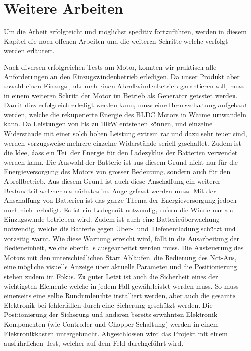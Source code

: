 \section{Weitere Arbeiten}
Um die Arbeit erfolgreicht und möglichst speditiv fortzuführen, werden in diesem Kapitel die noch offenen Arbeiten und die weiteren Schritte welche verfolgt werden erläutert.

Nach diversen erfolgreichen Tests am Motor, konnten wir praktisch alle Anforderungen an den Einzugswindenbetrieb erledigen. Da unser Produkt aber sowohl einen Einzugs-, als auch einen Abrollwindenbetrieb garantieren soll, muss in einem weiteren Schritt der Motor im Betrieb als Generator getestet werden. Damit dies erfolgreich erledigt werden kann, muss eine Bremsschaltung aufgebaut werden, welche die rekuperierte Energie des BLDC Motors in Wärme umwandeln kann. Da Leistungen von bis zu 10kW entstehen können, und einzelne Widerstände mit einer solch hohen Leistung extrem rar und dazu sehr teuer sind, werden vorzugsweise mehrere einzelne Widerstände seriell geschaltet. Zudem ist die Idee, dass ein Teil der Energie für den Ladezyklus der Batterien verwendet werden kann.
Die Auswahl der Batterie ist aus diesem Grund nicht nur für die Energieversorgung des Motors von grosser Bedeutung, sondern auch für den Abrollbetrieb. Aus diesem Grund ist auch diese Anschaffung ein weiterer Bestandteil welcher als nächstes ins Auge gefasst werden muss. Mit der Anschaffung von Batterien ist das ganze Thema der Energieversorgung jedoch noch nicht erledigt. Es ist ein Ladegerät notwendig, sofern die Winde nur als Einzugswinde betrieben wird. Zudem ist auch eine Batterieüberwachung notwendig, welche die Batterie gegen Über-, und Tiefenentladung schützt und vorzeitig warnt. Wie diese Warnung erreicht wird, fällt in die Ausarbeitung der Bedieneinheit, welche ebenfalls ausgearbeitet werden muss. Die Ansteuerung des Motors mit den unterschiedlichen Start Abläufen, die Bedienung des Not-Aus, eine mögliche visuelle Anzeige über aktuelle Parameter und die Positionierung stehen zudem im Fokus.
Zu guter Letzt ist auch die Sicherheit eines der wichtigsten Elemente welche in jedem Fall gewährleistet werden muss. So muss einerseits eine gelbe Rundumleuchte installiert werden, aber auch die gesamte Elektronik bei fehlerfällen durch eine Sicherung geschützt werden. Die Positionierung der Sicherung und anderen bereits erwähnten Elektronik Komponenten (wie Controller und Chopper Schaltung) werden  in einem Elektronikkasten untergebracht.
Abgeschlossen wird das Projekt mit einem ausführlichen Test, welcher auf dem Feld durchgeführt wird.